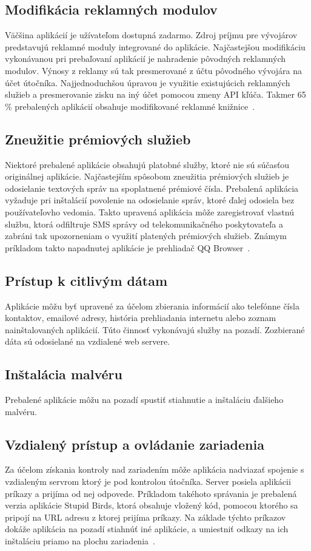 \subsection*{Modifikácia reklamných modulov}
Väčšina aplikácií je užívateľom dostupná zadarmo. Zdroj príjmu pre vývojárov predstavujú reklamné moduly integrované do aplikácie. Najčastejšou modifikáciu vykonávanou pri prebaľovaní aplikácií je nahradenie pôvodných reklamných modulov. Výnosy z reklamy sú tak presmerované z účtu pôvodného vývojára na účet útočníka. Najjednoduchšou úpravou je využitie existujúcich reklamných služieb a presmerovanie zisku na iný účet pomocou zmeny API kľúča. Takmer 65 \% prebalených aplikácií obsahuje modifikované reklamné knižnice~\cite{fakeapps}.

\subsection*{Zneužitie prémiových služieb}
Niektoré prebalené aplikácie obsahujú platobné služby, ktoré nie sú súčasťou originálnej aplikácie. Najčastejším spôsobom zneužitia prémiových služieb je odosielanie textových správ na spoplatnené prémiové čísla. Prebalená aplikácia vyžaduje pri inštalácií povolenie na odosielanie správ, ktoré ďalej odosiela bez používateľovho vedomia. Takto upravená aplikácia môže zaregistrovať vlastnú službu, ktorá odfiltruje SMS správy od telekomunikačného poskytovateľa a zabráni tak upozorneniam o využití platených prémiových služieb. Známym príkladom takto napadnutej aplikácie je prehliadač QQ Browser~\cite{fakeapps}.

\subsection*{Prístup k citlivým dátam}
Aplikácie môžu byť upravené za účelom zbierania informácií ako telefónne čísla kontaktov, emailové adresy, história prehliadania internetu alebo zoznam nainštalovaných aplikácií. Túto činnosť vykonávajú služby na pozadí. Zozbierané dáta sú odosielané na vzdialené web servere. 

\subsection*{Inštalácia malvéru}
Prebalené aplikácie môžu na pozadí spustiť stiahnutie a inštaláciu ďalšieho malvéru. 

\subsection*{Vzdialený prístup a ovládanie zariadenia}
Za účelom získania kontroly nad zariadením môže aplikácia nadviazať spojenie s vzdialeným servrom ktorý je pod kontrolou útočníka. Server posiela aplikácii príkazy a prijíma od nej odpovede. Príkladom takéhoto správania je prebalená verzia aplikácie Stupid Birds, ktorá obsahuje vložený kód, pomocou ktorého sa pripojí na URL adresu z ktorej prijíma príkazy. Na základe týchto príkazov dokáže aplikácia na pozadí stiahnúť iné aplikácie, a umiestniť odkazy na ich inštaláciu priamo na plochu zariadenia~\cite{fakeapps}. 

